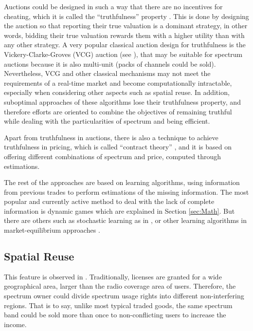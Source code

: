 Auctions could be designed in such a way that there are no incentives for cheating, which it is called the ``truthfulness'' property \cite{ref:Zhou2008,ref:Gopinathan2011,ref:Zhu2012,ref:Jia2009_Rev,ref:Zhou2009_TRUST,ref:Wang2010_TODA,ref:Gao2011_MAP}. This is done by designing the auction so that reporting their true valuation is a dominant strategy, in other words, bidding their true valuation rewards them with a higher utility than with any other strategy. A very popular classical auction design for truthfulness is the Vickery-Clarke-Groves (VCG) auction (see \cite{ref:Yu2011_Cog}), that may be suitable for spectrum auctions because it is also multi-unit (packs of channels could be sold). Nevertheless, VCG and other classical mechanisms may not meet the requirements of a real-time market and become computationally intractable, especially when considering other aspects such as spatial reuse. In addition, suboptimal approaches of these algorithms lose their truthfulness property, and therefore efforts are oriented to combine the objectives of remaining truthful while dealing with the particularities of spectrum and being efficient. 

Apart from truthfulness in auctions, there is also a technique to achieve truthfulness in pricing, which is called ``contract theory'' \cite{ref:Duan2011_Contract,ref:Gao2011}, and it is based on offering different combinations of spectrum and price, computed through estimations. 

The rest of the approaches are based on learning algorithms, using information from previous trades to perform estimations of the missing information. The most popular and currently active method to deal with the lack of complete information is dynamic games \cite{ref:Niyato2007_Game,ref:Jia2008,ref:Niyato2008_Comp,ref:Zhu2012_Dyn,ref:Dixit2010,ref:Niyato2009_Dyn,ref:Ji2008,ref:Dixit2010} which are explained in Section \ref{sec:Math}. But there are others such as stochastic learning as in \cite{ref:Xing2007}, or other learning algorithms in market-equilibrium approaches \cite{ref:Niyato2007_Hier,ref:Niyato2007_Eq,ref:Niyato2008_Mark,ref:Niyato2008_Spec,ref:Niyato2010}. 

\subsection{Spatial Reuse}
\label{subsec:Spatial} 
This feature is observed in \cite{ref:Zhou2008,ref:Gopinathan2011,ref:Zhu2012,ref:Kaskebar2012,ref:Xu2011,ref:Gandhi2008}. Traditionally, licenses are granted for a wide geographical area, larger than the radio coverage area of users. Therefore, the spectrum owner could divide spectrum usage rights into different non-interfering regions. That is to say, unlike most typical traded goods, the same spectrum band could be sold more than once to non-conflicting users to increase the income.

